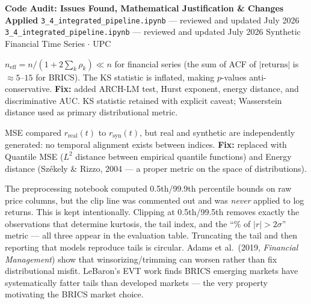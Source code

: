 \documentclass[10pt]{article}
\newcommand{\pagehead}[2]{%
  \begin{tcolorbox}[enhanced,arc=0pt,outer arc=0pt,boxrule=0pt,
    colback=Navy,colframe=Navy,
    top=5pt,bottom=5pt,left=8pt,right=8pt,
    before skip=0pt,after skip=10pt]
  {\color{white}\large\bfseries #1}%
  \ifx\relax#2\relax\else\\[1pt]{\color{blue!30!white}\small #2}\fi
  \hfill{\color{blue!20!white}\footnotesize Synthetic Financial Time Series $\cdot$ UPC}
  \end{tcolorbox}}
\begin{document}
\clearpage

\pagehead{Code Audit: Issues Found, Mathematical Justification \& Changes Applied}
         {\texttt{3\_4\_integrated\_pipeline.ipynb} --- reviewed and updated July 2026}

\vspace{4pt}
\newcommand{\auditrow}[5]{%
  \begin{tcolorbox}[mybox={#2}{#3},
    title={\textbf{[#1]}\quad #4},
    before skip=4pt, after skip=4pt, breakable]
  \small #5
  \end{tcolorbox}}

\auditrow{FIXED}{DRed}{RBg}%
  {KS / Welch tests assumed i.i.d.\ --- CRITICAL}%
  {$n_\text{eff} = n/(1+2\sum_k\rho_k) \ll n$ for financial series (the sum of ACF of $|\text{returns}|$ is $\approx 5$--$15$ for BRICS). The KS statistic is inflated, making $p$-values anti-conservative. \textbf{Fix:} added ARCH-LM test, Hurst exponent, energy distance, and discriminative AUC. KS statistic retained with explicit caveat; Wasserstein distance used as primary distributional metric.}

\auditrow{FIXED}{DRed}{RBg}%
  {Pointwise MSE/MAE had no semantic meaning}%
  {MSE compared $r_\text{real}(t)$ to $r_\text{syn}(t)$, but real and synthetic are independently generated: no temporal alignment exists between indices. \textbf{Fix:} replaced with Quantile MSE ($L^2$ distance between empirical quantile functions) and Energy distance (Sz\'{e}kely \& Rizzo, 2004 --- a proper metric on the space of distributions).}

\auditrow{DECISION}{Indigo}{IBg}%
  {No outlier clipping applied to log returns --- deliberate methodological choice}%
  {The preprocessing notebook computed 0.5th/99.9th percentile bounds on raw price columns, but the clip line was commented out and was \emph{never} applied to log returns. This is kept intentionally. Clipping at 0.5th/99.5th removes exactly the observations that determine kurtosis, the tail index, and the ``\% of $|r|>2\sigma$'' metric --- all three appear in the evaluation table. Truncating the tail and then reporting that models reproduce tails is circular. Adams et al.\ (2019, \textit{Financial Management}) show that winsorizing/trimming can worsen rather than fix distributional misfit. LeBaron's EVT work finds BRICS emerging markets have systematically fatter tails than developed markets --- the very property motivating the BRICS market choice.}
\end{document}

